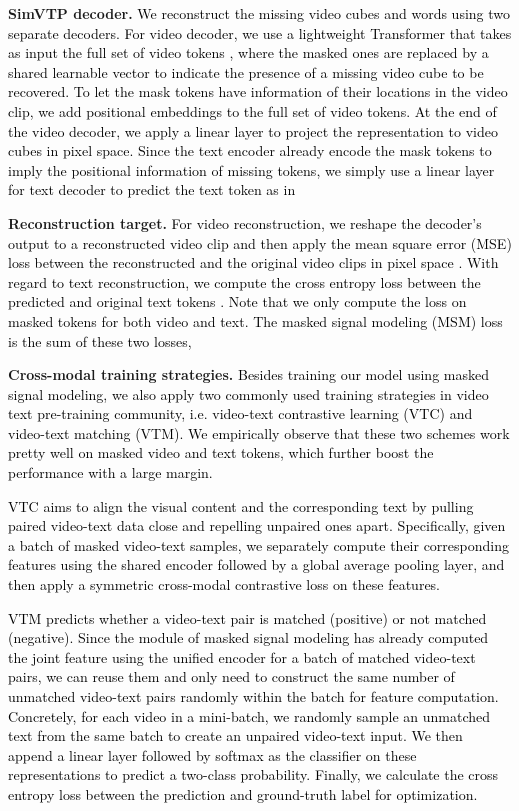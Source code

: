 \documentclass[10pt,twocolumn,letterpaper]{article}
\newcommand{\yty}[1]{\textcolor{black}{#1}}
\begin{document}
\noindent\textbf{SimVTP decoder.}
\yty{We reconstruct the missing video cubes and words using two separate decoders.  For video decoder, we use a lightweight Transformer that takes as input the full set of video tokens \cite{tong2022videomae}, where the masked ones are replaced by a shared learnable vector to indicate the presence of a missing video cube to be recovered.  To let the mask tokens have information of their locations in the video clip, we add positional embeddings to the full set of video tokens.  At the end of the video decoder, we apply a linear layer to project the representation to video cubes in pixel space. Since the text encoder already encode the mask tokens to imply the positional information of missing tokens, we simply use a linear layer for text decoder to predict the text token as in \cite{devlin2018bert}}



\noindent\textbf{Reconstruction target.}
\yty{For video reconstruction, we reshape the decoder's output to a reconstructed video clip and then apply the mean square error (MSE) loss between the reconstructed and the original video clips in pixel space \cite{tong2022videomae}. With regard to text reconstruction, we compute the cross entropy loss between the predicted and original text tokens \cite{devlin2018bert}. Note that we only compute the loss on masked tokens for both video and text. The masked signal modeling (MSM) loss  is the sum of these two losses, }


\noindent\textbf{Cross-modal training strategies.}
\yty{Besides training our model using masked signal modeling, we also apply two commonly used training strategies in video text pre-training community, i.e. video-text contrastive learning (VTC) and video-text matching (VTM). We empirically observe that these two schemes work pretty well on masked video and text tokens, which further boost the performance with a large margin.}

\yty{VTC aims to align the visual content and the corresponding text by pulling paired video-text data close and repelling unpaired ones apart. Specifically, given a batch of masked video-text samples, we separately compute their corresponding features using the shared encoder followed by a global average pooling layer, and then apply a symmetric cross-modal contrastive loss \cite{radford2021learning}   on these features.}


\yty{VTM predicts whether a video-text pair is matched (positive) or not matched (negative).  Since the module of masked signal modeling has already computed the joint feature using the unified encoder for a batch of matched video-text pairs, we can reuse them and only need to construct the same number of unmatched video-text pairs randomly within the batch for feature computation. Concretely, for each video in a mini-batch, we randomly sample an unmatched text from the same batch to create an unpaired video-text input. We then append a linear layer followed by softmax as the classifier on these representations to predict a two-class probability. Finally, we calculate the cross entropy loss  between the prediction and ground-truth label for optimization.}
\end{document}
